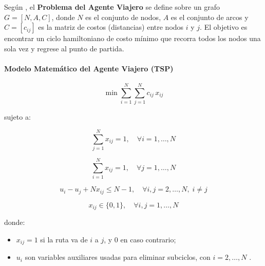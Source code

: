 \documentclass[12pt,titlepage,twoside,openright]{book}
\begin{document}
Según \citep{torres2018}, el \textbf{Problema del Agente Viajero} se define sobre un grafo \(G = [N,A,C]\), donde \(N\) es el conjunto de nodos, \(A\) es el conjunto de arcos y \(C = [c_{ij}]\) es la matriz de costos (distancias) entre nodos \(i\) y \(j\). El objetivo es encontrar un ciclo hamiltoniano de costo mínimo que recorra todos los nodos una sola vez y regrese al punto de partida.

\paragraph{Modelo Matemático del Agente Viajero (TSP)}

\begin{equation}
	\min \sum_{i=1}^N \sum_{j=1}^N c_{ij}\,x_{ij}
	\label{eq:TSP_obj}
\end{equation}

sujeto a:

\begin{equation}
	\sum_{j=1}^N x_{ij} = 1, \quad \forall i = 1,\dots,N
	\label{eq:TSP_out}
\end{equation}

\begin{equation}
	\sum_{i=1}^N x_{ij} = 1, \quad \forall j = 1,\dots,N
	\label{eq:TSP_in}
\end{equation}

\begin{equation}
	u_i - u_j + N x_{ij} \leq N - 1, \quad \forall i,j = 2,\dots,N, \; i \neq j
	\label{eq:TSP_subtour}
\end{equation}

\begin{equation}
	x_{ij} \in \{0,1\}, \quad \forall i,j = 1,\dots,N
	\label{eq:TSP_bin}
\end{equation}

\medskip

\noindent donde:
\begin{itemize}
	\item \(x_{ij} = 1\) si la ruta va de \(i\) a \(j\), y 0 en caso contrario;
	\item \(u_i\) son variables auxiliares usadas para eliminar subciclos, con \(i=2,\dots,N\) \citep{torres2018}.
\end{itemize}
\end{document}

